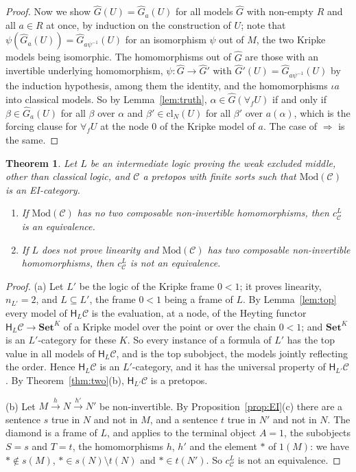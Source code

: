 \documentclass[11pt]{amsart}
\newtheorem{thm}{Theorem}[section]
\theoremstyle{definition}
\newcommand{\Set}{\mathbf{Set}}
\newcommand{\Mod}{\mathrm{Mod}}
\newcommand{\HH}{\mathsf H}
\newcommand{\cC}{\mathcal C}
\newcommand{\cl}{\mathrm{cl}}
\begin{document}
\begin{proof}
Now we show $\hat G(U)=\hat G_a(U)$ for all models $\hat G$ with
non-empty $R$ and all $a\in R$ at once, by induction on the
construction of $U$; note that $\psi(\hat G_a(U))=\hat G_{a\psi^{-1}}
(U)$ for an isomorphism $\psi$ out of $M$, the two Kripke models being
isomorphic. The homomorphisms out of $\hat G$ are those with an
invertible underlying homomorphism, $\psi\colon\hat G\to\hat G'$ with
$\hat G'(U)=\hat G_{a\psi^{-1}}(U)$ by the induction hypothesis, among
them the identity, and the homomorphisms $\iota a$ into classical
models. So by Lemma~\ref{lem:truth}, $\alpha\in\hat G(\forall_fU)$ if
and only if $\beta\in\hat G_a(U)$ for all $\beta$ over $\alpha$ and
$\beta'\in\cl_N(U)$ for all $\beta'$ over $a(\alpha)$, which is the
forcing clause for $\forall_fU$ at the node $0$ of the Kripke model
of $a$. The case of $\Rightarrow$ is the same.
\end{proof}

\begin{thm}\label{thm:wem}
Let $L$ be an intermediate logic proving the weak excluded middle,
other than classical logic, and $\cC$ a pretopos with finite sorts
such that $\Mod(\cC)$ is an EI-category.
\begin{enumerate}
\item[(a)] If $\Mod(\cC)$ has no two composable non-invertible
homomorphisms, then $c^L_\cC$ is an equivalence.
\item[(b)] If $L$ does not prove linearity and $\Mod(\cC)$ has two
composable non-invertible homomorphisms, then $c^L_\cC$ is not an
equivalence.
\end{enumerate}
\end{thm}
\begin{proof}
(a) Let $L'$ be the logic of the Kripke frame $0<1$; it proves
linearity, $n_{L'}=2$, and $L\subseteq L'$, the frame $0<1$ being a
frame of $L$. By Lemma~\ref{lem:top} every model of $\HH_L\cC$ is the
evaluation, at a node, of the Heyting functor $\HH_L\cC\to\Set^K$ of a
Kripke model over the point or over the chain $0<1$; and $\Set^K$ is
an $L'$-category for these $K$. So every instance of a formula of
$L'$ has the top value in all models of $\HH_L\cC$, and is the top
subobject, the models jointly reflecting the order. Hence $\HH_L\cC$
is an $L'$-category, and it has the universal property of
$\HH_{L'}\cC$. By Theorem~\ref{thm:two}(b), $\HH_{L'}\cC$ is a
pretopos.

(b) Let $M\xrightarrow{h}N\xrightarrow{h'}N'$ be non-invertible. By
Proposition~\ref{prop:EI}(c) there are a sentence $s$ true in $N$ and
not in $M$, and a sentence $t$ true in $N'$ and not in $N$. The
diamond is a frame of $L$, and \cite[Prop.~5.1]{Interm} applies to the
terminal object $A=1$, the subobjects $S=s$ and $T=t$, the
homomorphisms $h$, $h'$ and the element $\ast$ of $1(M)$: we have
$\ast\notin s(M)$, $\ast\in s(N)\setminus t(N)$ and $\ast\in t(N')$.
So $c^L_\cC$ is not an equivalence.
\end{proof}
\end{document}
